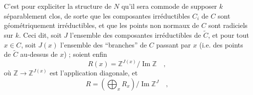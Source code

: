 C'est pour expliciter la structure de $N$ qu'il sera commode de supposer $k$ séparablement clos, de sorte que les composantes irréductibles $C_i$ de $C$ sont géométriquement irréductibles, et que les points non normaux de $C$ sont radiciels sur $k$. Ceci dit, soit $J$ l'ensemble des composantes irréductibles de $\widetilde C$, et pour tout $x\in C$, soit $J(x)$ l'ensemble des ``branches'' de $C$ passant par $x$ (i.e. des points de $\widetilde C$ au-dessus de $x$) ; soient enfin
\[
 R(x)=\mathbb{Z}^{J(x)}/\operatorname{Im}\mathbb{Z}\quad ,\tag*{(12.3.1)}
\]
où $\mathbb{Z}\longrightarrow\mathbb{Z}^{J(x)}$ est l'application diagonale, et
\[
 R=(\bigoplus_x R_x)/\operatorname{Im}\mathbb{Z}^J\quad ,\tag*{(12.3.2)}
\]

